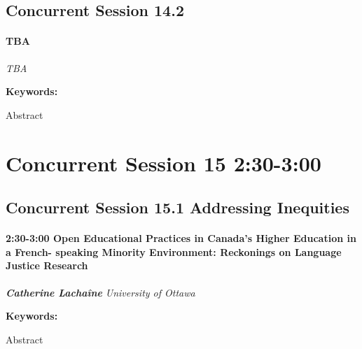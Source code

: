 \documentclass[
]{book}
\begin{document}
\hypertarget{concurrent-session-14.2}{%
\subsection*{Concurrent Session 14.2}\label{concurrent-session-14.2}}

\begin{speaker}
\hypertarget{tba}{%
\paragraph{\texorpdfstring{\textbf{TBA}}{TBA}}\label{tba}}

\emph{TBA}

\textbf{Keywords:}

Abstract
\end{speaker}

\hypertarget{concurrent-session-15-230-300}{%
\section*{Concurrent Session 15 \textbar{} 2:30-3:00}\label{concurrent-session-15-230-300}}

\hypertarget{concurrent-session-15.1-addressing-inequities}{%
\subsection*{Concurrent Session 15.1 \textbar{} Addressing Inequities}\label{concurrent-session-15.1-addressing-inequities}}

\begin{session}
\hypertarget{open-educational-practices-in-canadas-higher-education-in-a-french--speaking-minority-environment-reckonings-on-language-justice-research}{%
\paragraph*{\texorpdfstring{2:30-3:00 \textbar{} \textbf{Open
Educational Practices in Canada's Higher Education in a French- speaking
Minority Environment: Reckonings on Language Justice} \textbar{}
Research}{2:30-3:00 \textbar{} Open Educational Practices in Canada's Higher Education in a French- speaking Minority Environment: Reckonings on Language Justice \textbar{} Research}}\label{open-educational-practices-in-canadas-higher-education-in-a-french--speaking-minority-environment-reckonings-on-language-justice-research}}

\textbf{\emph{Catherine Lachaîne}} \textbar{} \emph{University of
Ottawa}

\textbf{Keywords:}

Abstract
\end{session}
\end{document}
